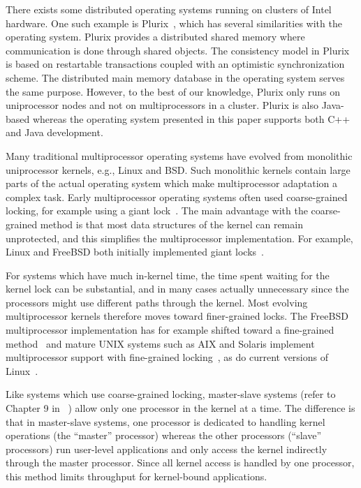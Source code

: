 There exists some distributed operating systems running on clusters of Intel
hardware. One such example is Plurix~\cite{goeckelmann03plurix}, which has
several similarities with the operating system. Plurix provides a distributed
shared memory where communication is done through shared objects.  The
consistency model in Plurix is based on restartable transactions coupled with
an optimistic synchronization scheme. The distributed main memory database in
the operating system serves the same purpose. However, to the best of our
knowledge, Plurix only runs on uniprocessor nodes and not on multiprocessors
in a cluster.  Plurix is also Java-based whereas the operating system
presented in this paper supports both C++ and Java development.

Many traditional multiprocessor operating systems have evolved from monolithic
uniprocessor kernels, e.g., Linux and BSD. Such monolithic kernels contain
large parts of the actual operating system which make multiprocessor
adaptation a complex task. Early multiprocessor operating systems often used
coarse-grained locking, for example using a giant
lock~\cite{schimmel94unix}.  The main advantage with the coarse-grained
method is that most data structures of the kernel can remain unprotected, and
this simplifies the multiprocessor implementation. For example, Linux and
FreeBSD both initially implemented giant locks~\cite{beck98linux,lehey03freebsd}.

For systems which have much in-kernel time, the time spent waiting for the
kernel lock can be substantial, and in many cases actually unnecessary since
the processors might use different paths through the kernel. Most evolving
multiprocessor kernels therefore moves toward finer-grained locks. The FreeBSD
multiprocessor implementation has for example shifted toward a fine-grained
method~\cite{lehey03freebsd} and mature UNIX systems such as AIX and
Solaris implement multiprocessor support with fine-grained
locking~\cite{clark95symmetric,kleinman92solaris}, as do current versions of
Linux~\cite{love2003linux}.

Like systems which use coarse-grained locking, master-slave systems (refer to
Chapter 9 in ~\cite{schimmel94unix}) allow only one processor in the kernel
at a time. The difference is that in master-slave systems, one processor is
dedicated to handling kernel operations (the ``master'' processor) whereas the
other processors (``slave'' processors) run user-level applications and only
access the kernel indirectly through the master processor. Since all kernel
access is handled by one processor, this method limits throughput for
kernel-bound applications.

